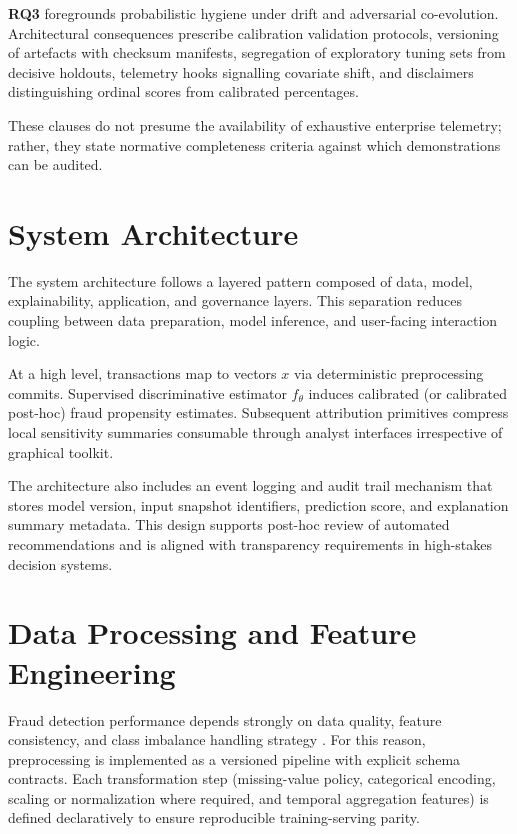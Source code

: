 \textbf{RQ3} foregrounds probabilistic hygiene under drift and adversarial co-evolution. Architectural consequences prescribe calibration validation protocols, versioning of artefacts with checksum manifests, segregation of exploratory tuning sets from decisive holdouts, telemetry hooks signalling covariate shift, and disclaimers distinguishing ordinal scores from calibrated percentages.

These clauses do not presume the availability of exhaustive enterprise telemetry; rather, they state normative completeness criteria against which demonstrations can be audited.

\section{System Architecture}
The system architecture follows a layered pattern composed of data, model, explainability, application, and governance layers. This separation reduces coupling between data preparation, model inference, and user-facing interaction logic.

At a high level, transactions map to vectors $x$ via deterministic preprocessing commits. Supervised discriminative estimator $f_\theta$ induces calibrated (or calibrated post-hoc) fraud propensity estimates. Subsequent attribution primitives compress local sensitivity summaries consumable through analyst interfaces irrespective of graphical toolkit.

The architecture also includes an event logging and audit trail mechanism that stores model version, input snapshot identifiers, prediction score, and explanation summary metadata. This design supports post-hoc review of automated recommendations and is aligned with transparency requirements in high-stakes decision systems.

\section{Data Processing and Feature Engineering}
Fraud detection performance depends strongly on data quality, feature consistency, and class imbalance handling strategy \cite{fraud_handbook}. For this reason, preprocessing is implemented as a versioned pipeline with explicit schema contracts. Each transformation step (missing-value policy, categorical encoding, scaling or normalization where required, and temporal aggregation features) is defined declaratively to ensure reproducible training-serving parity.

